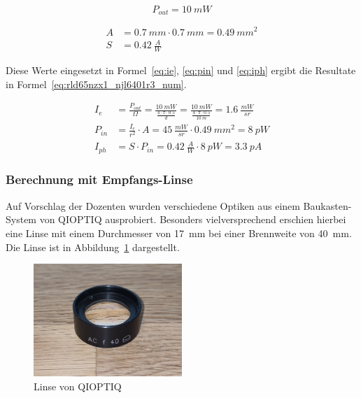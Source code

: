 \begin{equation}\label{eq:rld65nzx1_num}
    P_{out} = 10~mW
\end{equation}

\begin{equation}\label{eq:njl6401r3_num}
    \begin{split}
        A &= 0.7~mm \cdot 0.7~mm = 0.49~mm^2\\
        S &= 0.42~\frac{A}{W}
    \end{split}
\end{equation}

Diese Werte eingesetzt in Formel~\ref{eq:ie}, \ref{eq:pin} und \ref{eq:iph} ergibt die Resultate in
Formel~\ref{eq:rld65nzx1_njl6401r3_num}.

\begin{equation}\label{eq:rld65nzx1_njl6401r3_num}
    \begin{split}
        I_e    &= \frac{P_{out}}{\Omega} = \frac{10~mW}{\frac{4\cdot \pi \cdot 0.5}{d}} = \frac{10~mW}{\frac{4\cdot \pi \cdot 0.5}{10~m}} = 1.6~\frac{mW}{sr}\\
        P_{in} &= \frac{I_e}{r^2} \cdot A = 45~\frac{mW}{sr} \cdot 0.49~mm^2 = 8~pW\\
        I_{ph} &= S \cdot P_{in} = 0.42~\frac{A}{W} \cdot 8~pW = 3.3~pA
    \end{split}
\end{equation}

\subsubsection{Berechnung mit Empfangs-Linse}

Auf Vorschlag der Dozenten wurden verschiedene Optiken aus einem Baukasten-System von QIOPTIQ ausprobiert.
Besonders vielversprechend erschien hierbei eine Linse mit einem Durchmesser von 17~mm bei einer Brennweite von
40~mm. Die Linse ist in Abbildung~\ref{fig:lens} dargestellt.

\begin{figure}[H]
    \centering
    \includegraphics[width=0.5\textwidth]{graphics/photo_lens.jpg}
    \caption{Linse von QIOPTIQ}\label{fig:lens}
\end{figure}

